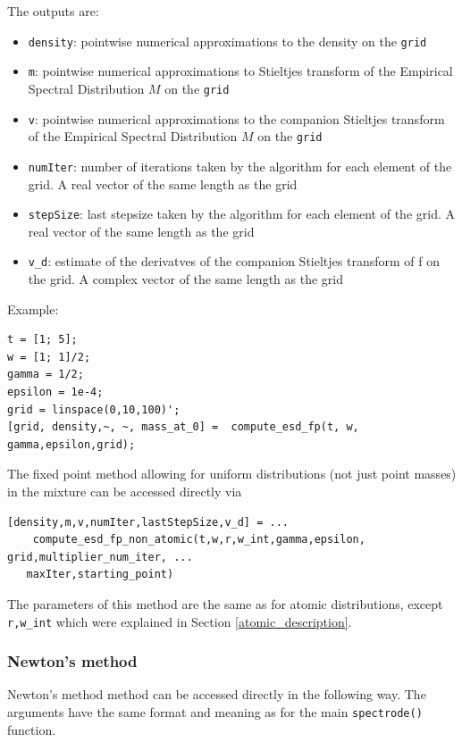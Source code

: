 \documentclass[english,11pt]{article} %
\begin{document}
The outputs are: 

\begin{itemize}
\item \verb+density+: pointwise numerical approximations to the density on the \verb+grid+
\item \verb+m+: pointwise numerical approximations to Stieltjes transform of the Empirical Spectral Distribution $M$ on the \verb+grid+
\item \verb+v+: pointwise numerical approximations to the companion Stieltjes transform of the Empirical Spectral Distribution $M$ on the \verb+grid+
\item \verb+numIter+: number of iterations taken by the algorithm for each element of the grid. A real vector of the same length as the grid
\item \verb+stepSize+: last stepsize taken by the algorithm for each element of
the grid. A real vector of the same length as the grid
\item \verb+v_d+: estimate of the derivatves of the companion Stieltjes transform of f on the grid. A complex vector of the same length as the grid

\end{itemize}

Example:

\begin{verbatim}
t = [1; 5]; 
w = [1; 1]/2;
gamma = 1/2; 
epsilon = 1e-4;
grid = linspace(0,10,100)';
[grid, density,~, ~, mass_at_0] =  compute_esd_fp(t, w, gamma,epsilon,grid);
\end{verbatim}


The fixed point method allowing for uniform distributions (not just point masses) in the mixture can be accessed directly via

\begin{verbatim}
[density,m,v,numIter,lastStepSize,v_d] = ...
    compute_esd_fp_non_atomic(t,w,r,w_int,gamma,epsilon, grid,multiplier_num_iter, ...
   maxIter,starting_point)
\end{verbatim}

The parameters of this method are the same as for atomic distributions, except \verb+r,w_int+ which were explained in Section \ref{atomic_description}.


\subsubsection{Newton's method}

Newton's method method can be accessed directly in the following way. The arguments have the same format and meaning as for the main \verb+spectrode()+ function. 
\end{document}
